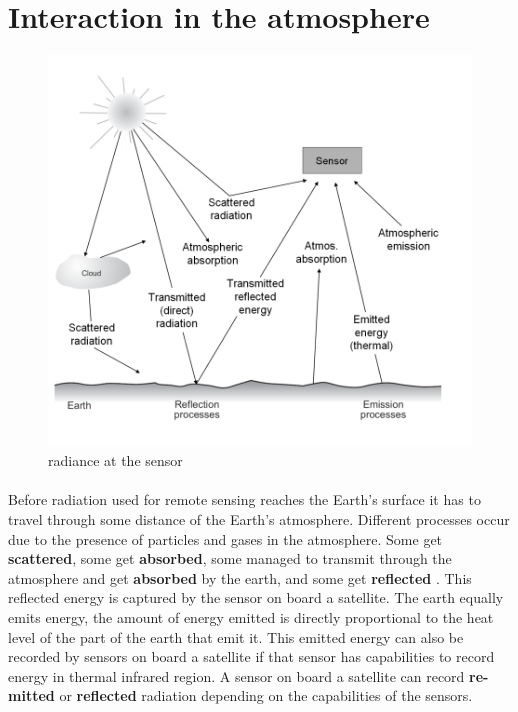 \section{Interaction in the atmosphere}
\begin{figure}
\begin{center}
\includegraphics[scale=0.8]{image3.png} %
\end{center}
\caption{radiance at the sensor}
\label{radiance at the sensor}%
\end{figure}
\paragraph{}
Before radiation used for remote sensing reaches the Earth's surface it has to travel through some distance of the Earth's atmosphere. Different processes occur due to the presence of particles and gases in the atmosphere. Some get \textbf{scattered}, some get \textbf{absorbed}, some managed to transmit through the atmosphere and get \textbf{absorbed}  by the earth, and some get \textbf{reflected} . This reflected energy is captured by the sensor on board a satellite.
The earth equally emits energy, the amount of energy emitted is directly proportional to the heat level of the part of the earth that emit it. This emitted energy can also be recorded by sensors on board a satellite if that sensor has capabilities to record energy in thermal infrared region. A sensor on board a satellite can record \textbf{re-mitted}  or \textbf{reflected} radiation depending on the capabilities of the sensors.













   